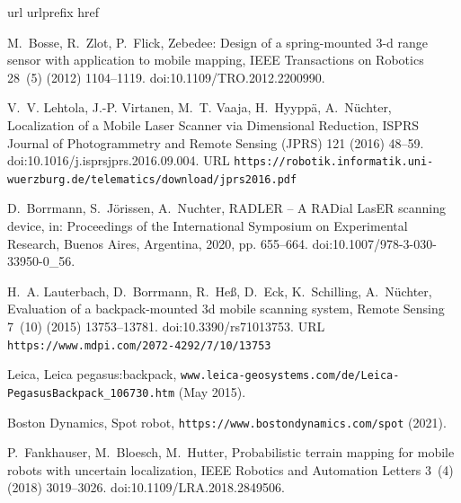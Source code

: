\documentclass[5p]{elsarticle}
\begin{document}
\begin{thebibliography}{10}
\expandafter\ifx\csname url\endcsname\relax
  \def\url#1{\texttt{#1}}\fi
\expandafter\ifx\csname urlprefix\endcsname\relax\def\urlprefix{URL }\fi
\expandafter\ifx\csname href\endcsname\relax
  \def\href#1#2{#2} \def\path#1{#1}\fi

M.~Bosse, R.~Zlot, P.~Flick, Zebedee: Design of a spring-mounted 3-d range
  sensor with application to mobile mapping, IEEE Transactions on Robotics
  28~(5) (2012) 1104--1119.
\newblock \href {http://dx.doi.org/10.1109/TRO.2012.2200990}
  {\path{doi:10.1109/TRO.2012.2200990}}.

V.~V. Lehtola, J.-P. Virtanen, M.~T. Vaaja, H.~Hyypp{\"a}, A.~N{\"u}chter,
  \href{https://robotik.informatik.uni-wuerzburg.de/telematics/download/jprs2016.pdf}{{Localization
  of a Mobile Laser Scanner via Dimensional Reduction}}, ISPRS Journal of
  Photogrammetry and Remote Sensing (JPRS) 121 (2016) 48--59.
\newblock \href {http://dx.doi.org/10.1016/j.isprsjprs.2016.09.004}
  {\path{doi:10.1016/j.isprsjprs.2016.09.004}}.
\newline\urlprefix\url{https://robotik.informatik.uni-wuerzburg.de/telematics/download/jprs2016.pdf}

D.~Borrmann, S.~Jörissen, A.~Nuchter, {RADLER -- A RADial LasER scanning
  device}, in: {Proceedings of the International Symposium on Experimental
  Research}, {Buenos Aires, Argentina}, 2020, pp. 655--664.
\newblock \href {http://dx.doi.org/10.1007/978-3-030-33950-0_56}
  {\path{doi:10.1007/978-3-030-33950-0_56}}.

H.~A. Lauterbach, D.~Borrmann, R.~Heß, D.~Eck, K.~Schilling, A.~Nüchter,
  \href{https://www.mdpi.com/2072-4292/7/10/13753}{Evaluation of a
  backpack-mounted 3d mobile scanning system}, Remote Sensing 7~(10) (2015)
  13753--13781.
\newblock \href {http://dx.doi.org/10.3390/rs71013753}
  {\path{doi:10.3390/rs71013753}}.
\newline\urlprefix\url{https://www.mdpi.com/2072-4292/7/10/13753}

Leica, Leica pegasus:backpack,
  {\small{\url{www.leica-geosystems.com/de/Leica-PegasusBackpack_106730.htm}}}
  ({May} {2015}).

{Boston Dynamics}, Spot robot, \url{https://www.bostondynamics.com/spot}
  (2021).

P.~Fankhauser, M.~Bloesch, M.~Hutter, Probabilistic terrain mapping for mobile
  robots with uncertain localization, IEEE Robotics and Automation Letters
  3~(4) (2018) 3019--3026.
\newblock \href {http://dx.doi.org/10.1109/LRA.2018.2849506}
  {\path{doi:10.1109/LRA.2018.2849506}}.


\end{thebibliography}
\end{document}

